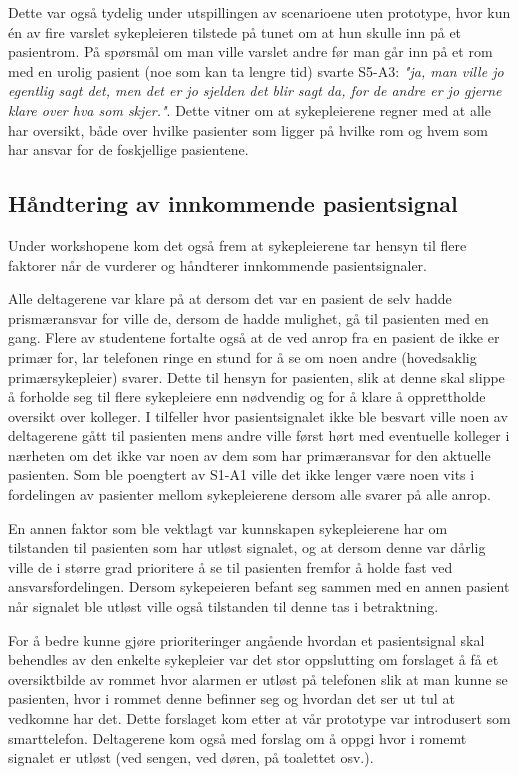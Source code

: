 Dette var også tydelig under utspillingen av scenarioene uten prototype, hvor kun én av fire varslet sykepleieren tilstede på tunet om at hun skulle inn på et pasientrom. På spørsmål om man ville varslet andre før man går inn på et rom med en urolig pasient (noe som kan ta lengre tid) svarte S5-A3: \emph{"ja, man ville jo egentlig sagt det, men det er jo sjelden det blir sagt da, for de andre er jo gjerne klare over hva som skjer."}. Dette vitner om at sykepleierene regner med at alle har oversikt, både over hvilke pasienter som ligger på hvilke rom og hvem som har ansvar for de foskjellige pasientene.
 

\subsection{Håndtering av innkommende pasientsignal}
Under workshopene kom det også frem at sykepleierene tar hensyn til flere faktorer når de vurderer og håndterer innkommende pasientsignaler. 


\noindent
Alle deltagerene var klare på at dersom det var en pasient de selv hadde prismæransvar for ville de, dersom de hadde mulighet, gå til pasienten med en gang.
Flere av studentene fortalte også at de ved anrop fra en pasient de ikke er primær for, lar telefonen ringe en stund for å se om noen andre (hovedsaklig primærsykepleier) svarer. Dette til hensyn for pasienten, slik at denne skal slippe å forholde seg til flere sykepleiere enn nødvendig og for å klare å opprettholde oversikt over kolleger. I tilfeller hvor pasientsignalet ikke ble besvart ville noen av deltagerene gått til pasienten mens andre ville først hørt med eventuelle kolleger i nærheten om det ikke var noen av dem som har primæransvar for den aktuelle pasienten. Som ble poengtert av S1-A1 ville det ikke lenger være noen vits i fordelingen av pasienter mellom sykepleierene dersom alle svarer på alle anrop.

\noindent
En annen faktor som ble vektlagt var kunnskapen sykepleierene har om tilstanden til pasienten som har utløst signalet, og at dersom denne var dårlig ville de i større grad prioritere å se til pasienten fremfor å holde fast ved ansvarsfordelingen. 
Dersom sykepeieren befant seg sammen med en annen pasient når signalet ble utløst ville også tilstanden til denne tas i betraktning. 

\noindent
For å bedre kunne gjøre prioriteringer angående hvordan et pasientsignal skal behendles av den enkelte sykepleier var det stor oppslutting om forslaget å få et oversiktbilde av rommet hvor alarmen er utløst på telefonen slik at man kunne se pasienten, hvor i rommet denne befinner seg og hvordan det ser ut tul at vedkomne har det. Dette forslaget kom etter at vår prototype var introdusert som smarttelefon. Deltagerene kom også med forslag om å oppgi hvor i romemt signalet er utløst (ved sengen, ved døren, på toalettet osv.).
